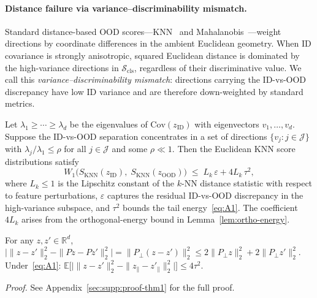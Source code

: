 \documentclass[runningheads]{llncs}
\begin{document}
\paragraph{Distance failure via variance--discriminability mismatch.}
Standard distance-based OOD scores---KNN~\cite{Sun2022knn} and Mahalanobis~\cite{Lee2018maha}---weight directions by coordinate differences in the ambient Euclidean geometry.
When ID covariance is strongly anisotropic, squared Euclidean distance is dominated by the high-variance directions in $\mathcal{S}_{\mathrm{cls}}$, regardless of their discriminative value.
We call this \emph{variance--discriminability mismatch}: directions carrying the ID-vs-OOD discrepancy have low ID variance and are therefore down-weighted by standard metrics.

\begin{theorem}\label{thm:dist-fail}
Let $\lambda_1 \ge \cdots \ge \lambda_d$ be the eigenvalues of $\mathrm{Cov}(z_{\mathrm{ID}})$ with eigenvectors $v_1,\ldots,v_d$.
Suppose the ID-vs-OOD separation concentrates in a set of directions $\{v_j : j \in \mathcal{J}\}$ with $\lambda_j / \lambda_1 \le \rho$ for all $j \in \mathcal{J}$ and some $\rho \ll 1$.
Then the Euclidean KNN score distributions satisfy
\begin{equation}
  W_1\!\bigl(S_{\mathrm{KNN}}(z_{\mathrm{ID}}),\; S_{\mathrm{KNN}}(z_{\mathrm{OOD}})\bigr) \;\le\; L_k\,\varepsilon + 4L_k\,\tau^2,
  \label{eq:knn-fail}
\end{equation}
where $L_k \le 1$ is the Lipschitz constant of the $k$-NN distance statistic with respect to feature perturbations, $\varepsilon$ captures the residual ID-vs-OOD discrepancy in the high-variance subspace, and $\tau^2$ bounds the tail energy~\eqref{eq:A1}.
The coefficient $4L_k$ arises from the orthogonal-energy bound in Lemma~\ref{lem:ortho-energy}.
\end{theorem}

\begin{lemma}\label{lem:ortho-energy}
For any $z, z' \in \mathbb{R}^d$,
$\bigl|\|z - z'\|_2^2 - \|Pz - Pz'\|_2^2\bigr| = \|P_\perp(z - z')\|_2^2 \le 2\|P_\perp z\|_2^2 + 2\|P_\perp z'\|_2^2.$
Under~\eqref{eq:A1}: $\mathbb{E}\bigl[\bigl|\|z - z'\|_2^2 - \|z_\parallel - z'_\parallel\|_2^2\bigr|\bigr] \le 4\tau^2$.
\end{lemma}

\noindent\emph{Proof.} See Appendix~\ref{sec:supp:proof-thm1} for the full proof.
\end{document}
